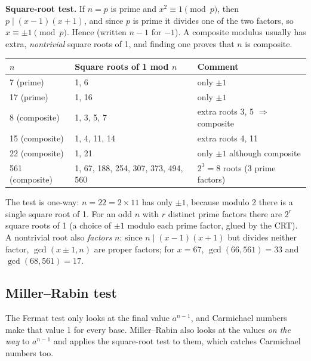 \textbf{Square-root test.} If $n = p$ is prime and $x^2 \equiv 1 \pmod p$, then $p \mid (x - 1)(x + 1)$, and since $p$ is prime it divides one of the two factors, so $x \equiv \pm 1 \pmod p$. Hence  (written $n - 1$ for $-1$). A composite modulus usually has extra, \emph{nontrivial} square roots of 1, and finding one proves that $n$ is composite.
\begin{center}\small
\begin{tabular}{@{}lll@{}}
\toprule
$n$ & Square roots of 1 mod $n$ & Comment\\
\midrule
7 (prime) & 1, 6 & only $\pm1$\\
17 (prime) & 1, 16 & only $\pm1$\\
8 (composite) & 1, 3, 5, 7 & extra roots 3, 5 $\Rightarrow$ composite\\
15 (composite) & 1, 4, 11, 14 & extra roots 4, 11\\
22 (composite) & 1, 21 & only $\pm1$ although composite\\
561 (composite) & 1, 67, 188, 254, 307, 373, 494, 560 & $2^3 = 8$ roots (3 prime factors)\\
\bottomrule
\end{tabular}
\end{center}
The test is one-way: $n = 22 = 2 \times 11$ has only $\pm 1$, because modulo 2 there is a single square root of 1. For an odd $n$ with $r$ distinct prime factors there are $2^r$ square roots of 1 (a choice of $\pm1$ modulo each prime factor, glued by the CRT). A nontrivial root also \emph{factors} $n$: since $n \mid (x - 1)(x + 1)$ but divides neither factor, $\gcd(x \pm 1, n)$ are proper factors; for $x = 67$, $\gcd(66, 561) = 33$ and $\gcd(68, 561) = 17$.

\subsection{Miller--Rabin test \hot}
The Fermat test only looks at the final value $a^{n-1}$, and Carmichael numbers make that value 1 for every base. Miller--Rabin also looks at the values \emph{on the way} to $a^{n-1}$ and applies the square-root test to them, which catches Carmichael numbers too.

